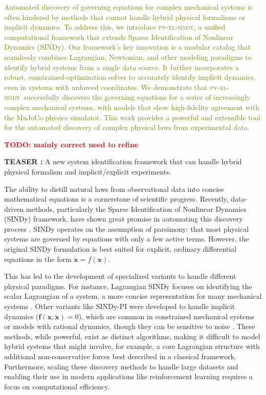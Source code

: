 \documentclass[12pt]{article}
\renewenvironment{abstract}
	{\quotation}
	{\endquotation}
\newcommand{\frameworkname}{\textsc{py-xl-sindy}}
\newcommand{\TODO}[1]{\textbf{\textcolor{red}{\Large TODO: \normalsize #1}}}
\newcommand{\airevised}[1]{\textcolor{olive}{\small #1}}
\begin{document}
\begin{abstract}
{}
\airevised{Automated discovery of governing equations for complex mechanical systems is often hindered by methods that cannot handle hybrid physical formalisms or implicit dynamics. To address this, we introduce \frameworkname, a unified computational framework that extends Sparse Identification of Nonlinear Dynamics (SINDy). Our framework's key innovation is a modular catalog that seamlessly combines Lagrangian, Newtonian, and other modeling paradigms to identify hybrid systems from a single data source. It further incorporates a robust, constrained-optimization solver to accurately identify implicit dynamics, even in systems with unforced coordinates. We demonstrate that \frameworkname\ successfully discovers the governing equations for a series of increasingly complex mechanical systems, with models that show high-fidelity agreement with the MuJoCo physics simulator. This work provides a powerful and extensible tool for the automated discovery of complex physical laws from experimental data.}

\TODO{mainly correct need to refine}
\end{abstract}

\textbf{TEASER : } A new system identification framework that can handle hybrid physical formalism and implicit/explicit experiments.

\noindent
The ability to distill natural laws from observational data into concise mathematical equations is a cornerstone of scientific progress. Recently, data-driven methods, particularly the Sparse Identification of Nonlinear Dynamics (SINDy) framework, have shown great promise in automating this discovery process \cite{Brunton2016_SINDy}. SINDy operates on the assumption of parsimony: that most physical systems are governed by equations with only a few active terms. However, the original SINDy formulation is best suited for explicit, ordinary differential equations in the form $\dot{\mathbf{x}} = f(\mathbf{x})$.

This has led to the development of specialized variants to handle different physical paradigms. For instance, Lagrangian SINDy focuses on identifying the scalar Lagrangian of a system, a more concise representation for many mechanical systems \cite{Chu2020_LagrangianSINDy, Purnomo2023_xLSINDy}. Other variants like SINDy-PI were developed to handle implicit dynamics ($\mathbf{f}(\mathbf{x}, \dot{\mathbf{x}}) = 0$), which are common in constrained mechanical systems or models with rational dynamics, though they can be sensitive to noise \cite{Kaheman2020_SINDyPI}. These methods, while powerful, exist as distinct algorithms, making it difficult to model hybrid systems that might involve, for example, a core Lagrangian structure with additional non-conservative forces best described in a classical framework. Furthermore, scaling these discovery methods to handle large datasets and enabling their use in modern applications like reinforcement learning requires a focus on computational efficiency.
\end{document}
